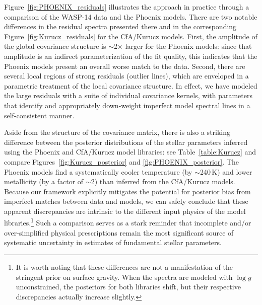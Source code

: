 \documentclass[iop,floatfix]{emulateapj}
\begin{document}

Figure~\ref{fig:PHOENIX_residuals} illustrates the approach in practice through a comparison of the 
WASP-14 data and the {\sc Phoenix} models.  There are two notable differences in the residual 
spectra presented there and in the corresponding Figure~\ref{fig:Kurucz_residuals} for the {\sc 
CfA/Kurucz} models.  First, the amplitude of the global covariance structure is $\sim$2$\times$ 
larger for the {\sc Phoenix} models: since that amplitude is an indirect parameterization of the 
fit quality, this indicates that the {\sc Phoenix} models present an overall worse match to the 
data.  Second, there are several local regions of strong residuals (outlier lines), which are 
enveloped in a parametric treatment of the local covariance structure.  In effect, we have modeled 
the large residuals with a suite of individual covariance kernels, with parameters that identify 
and appropriately down-weight imperfect model spectral lines in a self-consistent manner.

Aside from the structure of the covariance matrix, there is also a striking difference between the 
posterior distributions of the stellar parameters inferred using the {\sc Phoenix} and {\sc 
CfA/Kurucz} model libraries: see Table~\ref{table:Kurucz} and compare 
Figures~\ref{fig:Kurucz_posterior} and \ref{fig:PHOENIX_posterior}.  The {\sc Phoenix} models find 
a systematically cooler temperature (by $\sim$240\,K) and lower metallicity (by a factor of 
$\sim$2) than inferred from the {\sc CfA/Kurucz} models.  Because our framework explicitly 
mitigates the potential for posterior bias from imperfect matches between data and models, we can 
safely conclude that these apparent discrepancies are intrinsic to the different input physics of 
the model libraries.\footnote{It is worth noting that these differences are not a manifestation of 
the stringent prior on surface gravity.  When the spectra are modeled with $\log g$ unconstrained, 
the posteriors for both libraries shift, but their respective discrepancies actually increase 
slightly.}  Such a comparison serves as a stark reminder that incomplete and/or over-simplified 
physical prescriptions remain the most significant source of systematic uncertainty in estimates 
of fundamental stellar parameters.
\end{document}
